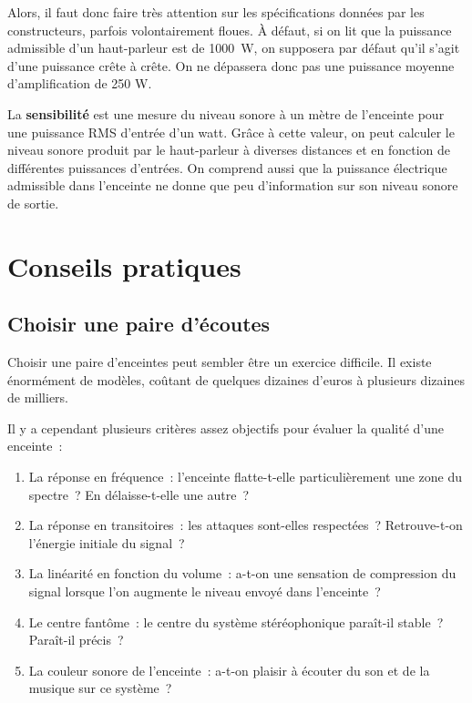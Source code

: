 \documentclass[
]{book}
\providecommand{\tightlist}{%
  \setlength{\itemsep}{0pt}\setlength{\parskip}{0pt}}
\begin{document}
Alors, il faut donc faire très attention sur les spécifications données par les constructeurs, parfois volontairement floues. À défaut, si on lit que la puissance admissible d'un haut-parleur est de 1000~W, on supposera par défaut qu'il s'agit d'une puissance crête à crête. On ne dépassera donc pas une puissance moyenne d'amplification de 250 W.

La \textbf{sensibilité} est une mesure du niveau sonore à un mètre de l'enceinte pour une puissance RMS d'entrée d'un watt. Grâce à cette valeur, on peut calculer le niveau sonore produit par le haut-parleur à diverses distances et en fonction de différentes puissances d'entrées. On comprend aussi que la puissance électrique admissible dans l'enceinte ne donne que peu d'information sur son niveau sonore de sortie.

\hypertarget{conseils-pratiques}{%
\section{Conseils pratiques}\label{conseils-pratiques}}

\hypertarget{choisir-une-paire-duxe9coutes}{%
\subsection{Choisir une paire d'écoutes}\label{choisir-une-paire-duxe9coutes}}

Choisir une paire d'enceintes peut sembler être un exercice difficile. Il existe énormément de modèles, coûtant de quelques dizaines d'euros à plusieurs dizaines de milliers.

Il y a cependant plusieurs critères assez objectifs pour évaluer la qualité d'une enceinte~:

\begin{enumerate}
\def\labelenumi{\arabic{enumi}.}
\tightlist
\item
  La réponse en fréquence~: l'enceinte flatte-t-elle particulièrement une zone du spectre~? En délaisse-t-elle une autre~?
\item
  La réponse en transitoires~: les attaques sont-elles respectées~? Retrouve-t-on l'énergie initiale du signal~?
\item
  La linéarité en fonction du volume~: a-t-on une sensation de compression du signal lorsque l'on augmente le niveau envoyé dans l'enceinte~?
\item
  Le centre fantôme~: le centre du système stéréophonique paraît-il stable~? Paraît-il précis~?
\item
  La couleur sonore de l'enceinte~: a-t-on plaisir à écouter du son et de la musique sur ce système~?
\end{enumerate}
\end{document}

